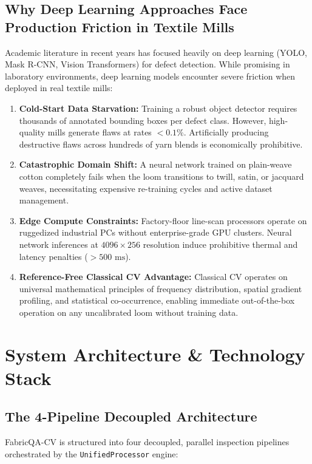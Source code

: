 \documentclass[10pt,a4paper]{article}
\begin{document}
\subsection{Why Deep Learning Approaches Face Production Friction in Textile Mills}
Academic literature in recent years has focused heavily on deep learning (YOLO, Mask R-CNN, Vision Transformers) for defect detection. While promising in laboratory environments, deep learning models encounter severe friction when deployed in real textile mills:
\begin{enumerate}[leftmargin=1.5em,itemsep=2pt]
    \item \textbf{Cold-Start Data Starvation:} Training a robust object detector requires thousands of annotated bounding boxes per defect class. However, high-quality mills generate flaws at rates $< 0.1\%$. Artificially producing destructive flaws across hundreds of yarn blends is economically prohibitive.
    \item \textbf{Catastrophic Domain Shift:} A neural network trained on plain-weave cotton completely fails when the loom transitions to twill, satin, or jacquard weaves, necessitating expensive re-training cycles and active dataset management.
    \item \textbf{Edge Compute Constraints:} Factory-floor line-scan processors operate on ruggedized industrial PCs without enterprise-grade GPU clusters. Neural network inferences at $4096 \times 256$ resolution induce prohibitive thermal and latency penalties ($> 500\text{ ms}$).
    \item \textbf{Reference-Free Classical CV Advantage:} Classical CV operates on universal mathematical principles of frequency distribution, spatial gradient profiling, and statistical co-occurrence, enabling immediate out-of-the-box operation on any uncalibrated loom without training data.
\end{enumerate}

\section{System Architecture \& Technology Stack}

\subsection{The 4-Pipeline Decoupled Architecture}
FabricQA-CV is structured into four decoupled, parallel inspection pipelines orchestrated by the \texttt{UnifiedProcessor} engine:
\end{document}
